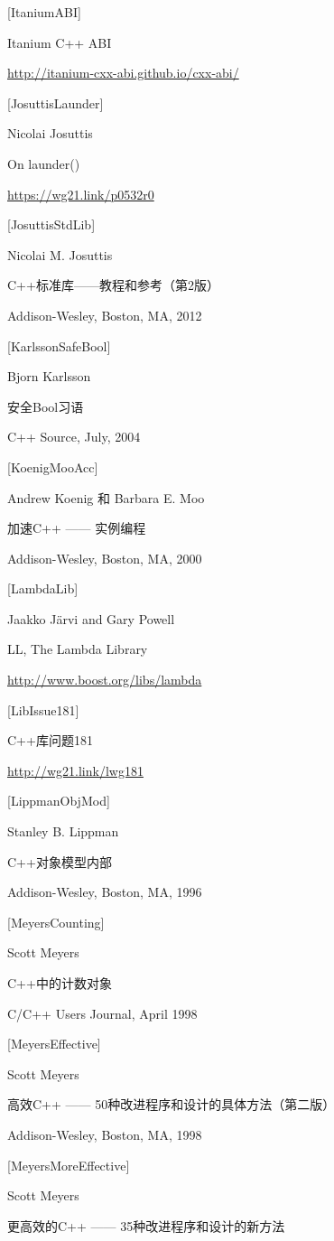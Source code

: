 {[ItaniumABI]}

Itanium C++ ABI

\url{http://itanium-cxx-abi.github.io/cxx-abi/}

{[JosuttisLaunder]}

Nicolai Josuttis

On launder()

\url{https://wg21.link/p0532r0}

{[JosuttisStdLib]}

Nicolai M. Josuttis

C++标准库——教程和参考（第2版）

Addison-Wesley, Boston, MA, 2012

{[KarlssonSafeBool]}

Bjorn Karlsson

安全Bool习语

C++ Source, July, 2004

{[KoenigMooAcc]}

Andrew Koenig 和 Barbara E. Moo

加速C++ —— 实例编程

Addison-Wesley, Boston, MA, 2000

{[LambdaLib]}

Jaakko J{\"a}rvi and Gary Powell

LL, The Lambda Library

\url{http://www.boost.org/libs/lambda}

{[LibIssue181]}

C++库问题181

\url{http://wg21.link/lwg181}

{[LippmanObjMod]}

Stanley B. Lippman

C++对象模型内部

Addison-Wesley, Boston, MA, 1996

{[MeyersCounting]}

Scott Meyers

C++中的计数对象

C/C++ Users Journal, April 1998

{[MeyersEffective]}

Scott Meyers

高效C++ —— 50种改进程序和设计的具体方法（第二版）

Addison-Wesley, Boston, MA, 1998

{[MeyersMoreEffective]}

Scott Meyers

更高效的C++ —— 35种改进程序和设计的新方法

